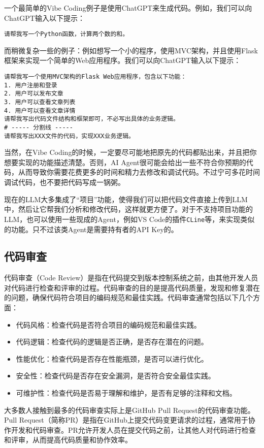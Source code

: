 一个最简单的Vibe Coding例子是使用ChatGPT来生成代码。例如，我们可以向ChatGPT输入以下提示：
\begin{lstlisting}
请帮我写一个Python函数，计算两个数的和。
\end{lstlisting}

而稍微复杂一些的例子：例如想写一个小的程序，使用MVC架构，并且使用Flask框架来实现一个简单的Web应用程序。我们可以向ChatGPT输入以下提示：
\begin{lstlisting}
请帮我写一个使用MVC架构的Flask Web应用程序，包含以下功能：
1. 用户注册和登录
2. 用户可以发布文章
3. 用户可以查看文章列表
4. 用户可以查看文章详情
请帮我写出代码文件结构和框架即可，不必写出具体的业务逻辑。
# ----- 分割线 -----
请帮我写出XXX文件的代码，实现XXX业务逻辑。
\end{lstlisting}
当然，在Vibe Coding的时候，一定要尽可能地把原先的代码都贴出来，并且把你想要实现的功能描述清楚。否则，AI Agent很可能会给出一些不符合你预期的代码，从而导致你需要花费更多的时间和精力去修改和调试代码。不过宁可多花时间调试代码，也不要把代码写成一锅粥。

现在的LLM大多集成了“项目”功能，使得我们可以把代码文件直接上传到LLM中，然后让它帮我们分析和修改代码，这样就更方便了。对于不支持项目功能的LLM，也可以使用一些现成的Agent，例如VS Code的插件\texttt{CLine}等，来实现类似的功能。只不过该类Agent是需要持有者的API Key的。

\subsection{代码审查}

代码审查（Code Review）是指在代码提交到版本控制系统之前，由其他开发人员对代码进行检查和评审的过程。代码审查的目的是提高代码质量，发现和修复潜在的问题，确保代码符合项目的编码规范和最佳实践。代码审查通常包括以下几个方面：
\begin{itemize}
  \item 代码风格：检查代码是否符合项目的编码规范和最佳实践。
  \item 代码逻辑：检查代码的逻辑是否正确，是否存在潜在的问题。
  \item 性能优化：检查代码是否存在性能瓶颈，是否可以进行优化。
  \item 安全性：检查代码是否存在安全漏洞，是否符合安全最佳实践。
  \item 可维护性：检查代码是否易于理解和维护，是否有足够的注释和文档。
\end{itemize}

大多数人接触到最多的代码审查实际上是GitHub Pull Request的代码审查功能。Pull Request（简称PR）是指在GitHub上提交代码变更请求的过程，通常用于协作开发和代码审查。PR允许开发人员在提交代码之前，让其他人对代码进行检查和评审，从而提高代码质量和协作效率。

